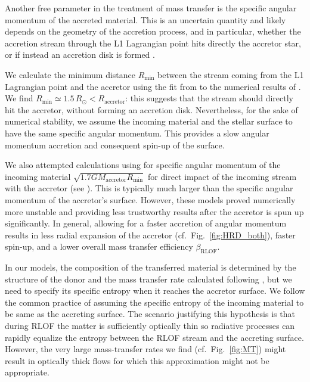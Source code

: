 \documentclass[twocolumn,twocolappendix,trackchanges]{aastex63}
\DeclareRobustCommand{\Figref}[1]{Fig.~\ref{#1}}
\begin{document}
Another free parameter in the treatment of mass transfer is the
specific angular momentum of the accreted material. This is an
uncertain quantity and likely depends on the geometry of the accretion
process, and in particular, whether the accretion stream through the
L1 Lagrangian point hits directly the accretor star, or if
instead an accretion disk is formed \citep[e.g.,][]{demink:13}.

We calculate the minimum distance $R_\mathrm{min}$ between the stream
coming from the L1 Lagrangian point and the accretor using the fit
from \cite{ulrich:76} to the numerical results of \cite{lubow:75}. We
find $R_\mathrm{min}\simeq 1.5\,R_\odot < R_\mathrm{accretor}$: this
suggests that the stream should directly hit the accretor, without
forming an accretion disk. Nevertheless, for the sake of numerical
stability, we assume the incoming material and the stellar surface to
have the same specific angular momentum. This provides a slow angular
momentum accretion and consequent spin-up of the surface.

We also attempted calculations using for specific angular momentum of
the incoming material $\sqrt{1.7GM_\mathrm{accretor}R_\mathrm{min}}$
\citep{lubow:75} for direct impact of the incoming stream with the
accretor (see \citealt{demink:13}). This is typically much larger than
the specific angular momentum of the accretor's surface. However,
these models proved numerically more unstable and providing less
trustworthy results after the accretor is spun up
significantly. In general, allowing for a faster accretion of
angular momentum results in less radial expansion of the accretor
(cf.~\Figref{fig:HRD_both}), faster spin-up, and a lower overall mass
transfer efficiency $\beta_\mathrm{RLOF}$.

In our models, the composition of the transferred material is
determined by the structure of the donor and the mass transfer rate
calculated following \cite{kolb:90}, but we need to specify its
specific entropy when it reaches the accretor surface. We follow the
common practice of assuming the specific entropy of the incoming
material to be same as the accreting surface. The scenario justifying
this hypothesis is that during RLOF the matter is
sufficiently optically thin so radiative processes can rapidly
equalize the entropy between the RLOF stream and the accreting
surface. However, the very large mass-transfer rates we find
(cf.~\Figref{fig:MT}) might result in optically thick flows for which
this approximation might not be appropriate.
\end{document}
